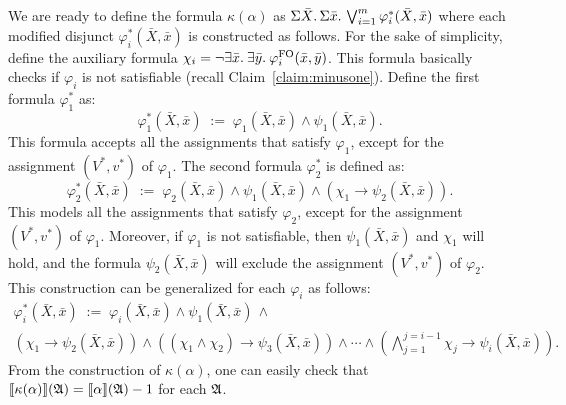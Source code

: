 We are ready to define the formula  $\kappa(\alpha)$ as $\Sigma{\bar{X}}.\,\Sigma{\bar{x}}.\, \bigvee_{i = 1}^m\varphi_i^*(\bar{X},\bar{x})$
where each modified disjunct $\varphi_i^*(\bar{X},\bar{x})$ is constructed as follows. 
For the sake of simplicity, define the auxiliary formula $\chi_i = \neg \exists{\bar{x}}.\: \exists{\bar{y}}.\:\varphi^{{\rm FO}}_i(\bar{x},\bar{y})$. 
This formula basically checks if $\varphi_i$ is not satisfiable (recall Claim~\ref{claim:minusone}).
Define the first formula $\varphi_1^*$ as:
\[
\varphi^*_1(\bar{X},\bar{x}) \; := \; \varphi_1(\bar{X},\bar{x})\wedge\psi_1(\bar{X},\bar{x}).
\]
This formula accepts all the assignments that satisfy $\varphi_1$, except for the assignment $(V^*,v^*)$ of $\varphi_1$. The second formula $\varphi_2^*$ is defined as:
\[
\varphi^*_2(\bar{X},\bar{x}) \; := \; \varphi_2(\bar{X},\bar{x})\wedge\psi_1(\bar{X},\bar{x})\wedge(\chi_1\to\psi_2(\bar{X},\bar{x})).
\]
This models all the assignments that satisfy $\varphi_2$, except for the assignment $(V^*,v^*)$ of $\varphi_1$. Moreover, if $\varphi_1$ is not satisfiable, then $\psi_1(\bar{X},\bar{x})$ and $\chi_1$ will hold, and the formula $\psi_2(\bar{X},\bar{x})$ will exclude the assignment $(V^*,v^*)$ of $\varphi_2$. 
This construction can be generalized for each $\varphi_i$ as follows:
\begin{multline*}
\varphi_i^*(\bar{X},\bar{x}) \; := \; \varphi_i(\bar{X},\bar{x})\wedge\psi_1(\bar{X},\bar{x})\,\wedge \\ (\chi_1\to\psi_2(\bar{X},\bar{x}))\wedge((\chi_1\wedge\chi_2)\to\psi_3(\bar{X},\bar{x}))\wedge\cdots\wedge(
\bigwedge_{j = 1}^{j = i-1}\chi_j\to\psi_i(\bar{X},\bar{x})).
\end{multline*}
From the construction of $\kappa(\alpha)$, one can easily check that  ${\llbracket{}{\kappa(\alpha)}\rrbracket}(\mathfrak{A}) = {\llbracket{}{\alpha}\rrbracket}(\mathfrak{A})-1$ for each $\mathfrak{A}$.

\medskip

